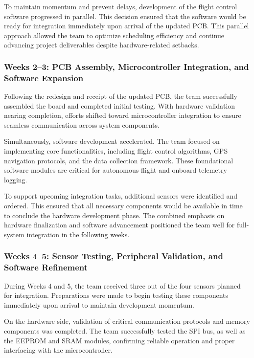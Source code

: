 \documentclass[12pt]{article}
\begin{document}
To maintain momentum and prevent delays, development of the flight control software progressed in parallel. This decision ensured that the software would be ready for integration immediately upon arrival of the updated PCB. This parallel approach allowed the team to optimize scheduling efficiency and continue advancing project deliverables despite hardware-related setbacks.

\subsubsection*{Weeks 2–3: PCB Assembly, Microcontroller Integration, and Software Expansion}

Following the redesign and receipt of the updated PCB, the team successfully assembled the board and completed initial testing. With hardware validation nearing completion, efforts shifted toward microcontroller integration to ensure seamless communication across system components.

Simultaneously, software development accelerated. The team focused on implementing core functionalities, including flight control algorithms, GPS navigation protocols, and the data collection framework. These foundational software modules are critical for autonomous flight and onboard telemetry logging.

To support upcoming integration tasks, additional sensors were identified and ordered. This ensured that all necessary components would be available in time to conclude the hardware development phase. The combined emphasis on hardware finalization and software advancement positioned the team well for full-system integration in the following weeks.

\subsubsection*{Weeks 4–5: Sensor Testing, Peripheral Validation, and Software Refinement}

During Weeks 4 and 5, the team received three out of the four sensors planned for integration. Preparations were made to begin testing these components immediately upon arrival to maintain development momentum.

On the hardware side, validation of critical communication protocols and memory components was completed. The team successfully tested the SPI bus, as well as the EEPROM and SRAM modules, confirming reliable operation and proper interfacing with the microcontroller.
\end{document}
